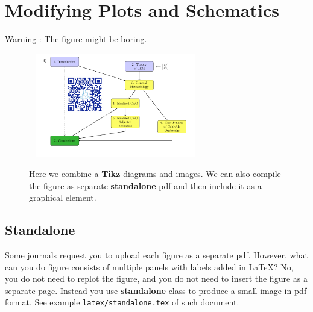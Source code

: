 \documentclass[a4paper,10pt]{report} %
\begin{document}
 \section{Modifying Plots and Schematics}\label{sec:figures}
  Warning :  The figure might be boring.\\
 \begin{figure}[!ht] 
      ~\hspace{-2ex}
    \includegraphics[width=0.62\textwidth]{./figures/standalone.pdf}
        \caption[Diagrams and plots]{Here we combine a \textbf{Tikz} diagrams and images. We can also compile the figure as separate \textbf{standalone}  pdf and then include it as a graphical element. }  
      \label{fig:figures}    
 \end{figure}
 
 \subsection{Standalone}
 Some journals request you to upload each figure as a separate pdf. However, what can you do figure consists of multiple panels with labels added in LaTeX? No, you do not need to replot the figure, and you do not need to insert the figure as a separate page. Instead you use \textbf{standalone} class to produce a small image in pdf format. See example \texttt{latex/standalone.tex} of such document.\\
 
\end{document}
